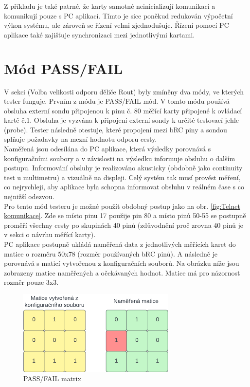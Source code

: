 Z příkladu je také patrné, že karty samotné neinicializují komunikaci a komunikují pouze s PC aplikací.
Tímto je sice poněkud redukován výpočetní výkon systému, ale zároveň se řízení velmi zjednodušuje.
Řízení pomocí PC aplikace také zajišťuje synchronizaci mezi jednotlivými kartami.

\section{Mód PASS/FAIL}
V sekci (Volba velikosti odporu děliče Rout) byly zmíněny dva módy, ve kterých tester funguje.
Prvním z módu je PASS/FAIL mód. V tomto módu používá obsluha externí sondu připojenou k pinu č. 80
měřící karty připojené k ovládací kartě č.1. Obsluha je vyzvána k připojení externí sondy k 
určité testovací jehle (probe). Tester následně otestuje, které propojení mezi bRC piny a sondou splňuje požadavky
na mezní hodnotu odporu cesty.\\

Naměřená jsou odesílána do PC aplikace, která výsledky porovnává
s konfiguračními soubory a v závislosti na výsledku informuje obsluhu o dalším postupu.
Informování obsluhy je realizováno akusticky (obdobně jako continuity test u multimetru)
a vizuálně na displeji. Celý systém tak musí provést měření, co nejrychleji, aby aplikace byla schopna informovat
obsluhu v reálném čase s co nejnižší odezvou.\\

Pro tento mód testeru je možné použít obdobný postup jako na obr. \ref{fig:Telnet komunikace}.
Zde se místo pinu 17 použije pin 80 a místo pinů 50-55 se postupně proměří všechny cesty po skupinách
40 pinů (zdůvodnění proč zrovna 40 pinů je v sekci o návrhu měřící karty).\\

PC aplikace postupně ukládá naměřená data z jednotlivých měřících karet do matice o rozměru 50x78 (rozměr používaných bRC pinů).
A následně je porovnává s maticí vytvořenou z konfiguračních souborů. Na obrázku níže jsou zobrazeny matice naměřených
a očekávaných hodnot. Matice má pro názornost rozměr pouze 3x3.

\begin{figure}[ht!]
    \centering
    \includegraphics[width = 0.7\textwidth]{obrazky/MATRIX_COMPARISSON.png}
    \caption{PASS/FAIL matrix}
    \label{fig:PASS/FAIL matrix}
\end{figure}

